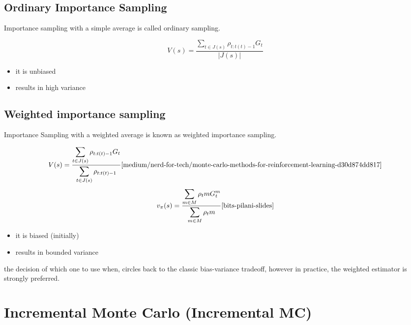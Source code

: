 \subsection{Ordinary Importance Sampling \cite{medium/nerd-for-tech/monte-carlo-methods-for-reinforcement-learning-d30d874dd817}}\label{RL: Ordinary Importance Sampling}

Importance sampling with a simple average is called ordinary sampling.

\[
    V(s) = \displaystyle\frac{\displaystyle\sum_{t\in J(s)} \rho_{t:t(t)-1}G_t}{|J(s)|}
\]

\begin{itemize}
    \item it is unbiased
    \item results in high variance
\end{itemize}

\subsection{Weighted importance sampling \cite{medium/nerd-for-tech/monte-carlo-methods-for-reinforcement-learning-d30d874dd817}}\label{RL: Weighted importance sampling}

Importance Sampling with a weighted average is known as weighted importance sampling.

\[
    V(s) = \displaystyle\frac{\displaystyle\sum_{t\in J(s)} \rho_{t:t(t)-1}G_t}{\displaystyle\sum_{t\in J(s)} \rho_{t:t(t)-1}} \hfill \text{\cite{medium/nerd-for-tech/monte-carlo-methods-for-reinforcement-learning-d30d874dd817}}
\]
\[
    v_\pi(s) = \displaystyle\frac{\displaystyle\sum_{m\in M} \rho_t m G_t^m}{\displaystyle\sum_{m\in M} \rho_t m} \hfill \text{\cite{bits-pilani-slides}}
\]

\begin{itemize}
    \item it is biased (initially)
    \item results in bounded variance
\end{itemize}

the decision of which one to use when, circles back to the classic bias-variance tradeoff, however in practice, the 
weighted estimator is strongly preferred.

\section{Incremental Monte Carlo (Incremental MC) \cite{redirect.cs.umbc.edu/courses/graduate/678/fall21/RL05}} \label{RL: Incremental Monte Carlo (Incremental MC)}

